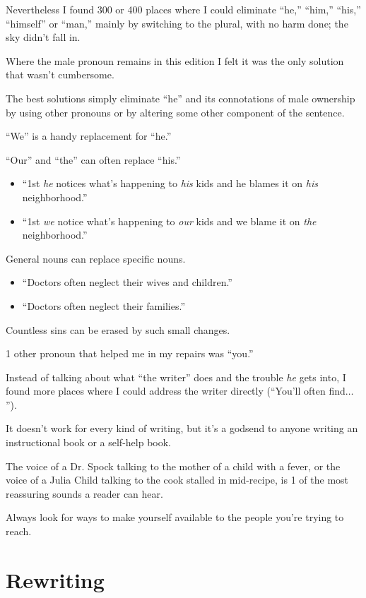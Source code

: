 \documentclass{book}
\numberwithin{equation}{section}
\begin{document}
Nevertheless I found 300 or 400 places where I could eliminate ``he,'' ``him,'' ``his,'' ``himself'' or ``man,'' mainly by switching to the plural, with no harm done; the sky didn't fall in.

Where the male pronoun remains in this edition I felt it was the only solution that wasn't cumbersome.

%
The best solutions simply eliminate ``he'' and its connotations of male ownership by using other pronouns or by altering some other component of the sentence.

``We'' is a handy replacement for ``he.''

``Our'' and ``the'' can often replace ``his.''
\begin{itemize}
    \item[(A)] ``1st \textit{he} notices what's happening to \textit{his} kids and he blames it on \textit{his} neighborhood.''
    \item[(B)] ``1st \textit{we} notice what's happening to \textit{our} kids and we blame it on \textit{the} neighborhood.''
\end{itemize}
General nouns can replace specific nouns.
\begin{itemize}
    \item[(A)] ``Doctors often neglect their wives and children.''
    \item[(B)] ``Doctors often neglect their families.''
\end{itemize}
Countless sins can be erased by such small changes.

%
1 other pronoun that helped me in my repairs was ``you.''

Instead of talking about what ``the writer'' does and the trouble \textit{he} gets into, I found more places where I could address the writer directly (``You'll often find$\ldots$'').

It doesn't work for every kind of writing, but it's a godsend to anyone writing an instructional book or a self-help book.

The voice of a Dr. Spock talking to the mother of a child with a fever, or the voice of a Julia Child talking to the cook stalled in mid-recipe, is 1 of the most reassuring sounds a reader can hear.

Always look for ways to make yourself available to the people you're trying to reach.

\section{Rewriting}
\end{document}
